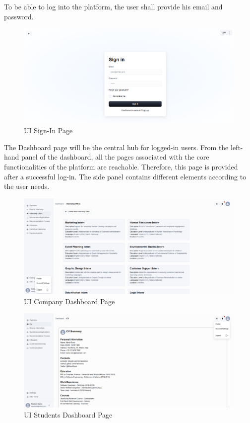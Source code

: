 To be able to log into the platform, the user shall provide his email and password. 
\begin{figure}[H]
    \centering
    \includegraphics[width=\textwidth]{Latex/Images/UI/v2/SignInPage.png}
    \caption{UI Sign-In Page}
    \label{fig:signinpage}
\end{figure}
\noindent The Dashboard page will be the central hub for logged-in users. From the left-hand panel of the dashboard, all the pages associated with the core functionalities of the platform are reachable. Therefore, this page is provided after a successful log-in. The side panel contains different elements according to the user needs.
\begin{figure}[H]
    \centering
    \includegraphics[width=\textwidth]{Latex/Images/UI/v2/Company-Dashboard.png}
    \caption{UI Company Dashboard Page}
    \label{fig:companyDashboard}
\end{figure}
\begin{figure}[H]
    \centering
    \includegraphics[width=\textwidth]{Latex/Images/UI/v2/Student-Dashboard.png}
    \caption{UI Students Dashboard Page}
    \label{fig:studentDashboard}
\end{figure}
